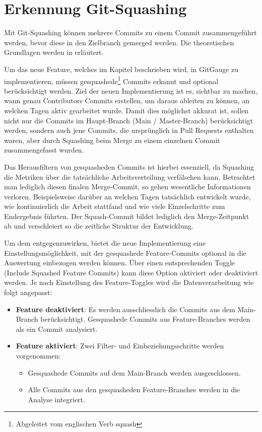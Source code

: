 \section{Erkennung Git-Squashing}
\label{sec:ErkennungSquashing}
Mit Git-Squashing können mehrere Commits zu einem Commit zusammengeführt werden, bevor diese in den Zielbranch gemerged werden. Die theoretischen Grundlagen werden in  erläutert. 


Um das neue Feature, welches im Kapitel  beschrieben wird, in GitGauge zu implementieren, müssen gesquashede\footnote{Abgeleitet vom englischen Verb squash} Commits erkannt und optional berücksichtigt werden. Ziel der neuen Implementierung ist es, sichtbar zu machen, wann genau Contributors Commits erstellen, um daraus ableiten zu können, an welchen Tagen aktiv gearbeitet wurde. Damit dies möglichst akkurat ist, sollen nicht nur die Commits im Haupt-Branch (Main / Master-Branch) berücksichtigt werden, sondern auch jene Commits, die ursprünglich in Pull Requests enthalten waren, aber durch Squashing beim Merge zu einem einzelnen Commit zusammengefasst wurden.

Das Herausfiltern von gesquasheden Commits ist hierbei essenziell, da Squashing die Metriken über die tatsächliche Arbeitsverteilung verfälschen kann. Betrachtet man lediglich diesen finalen Merge-Commit, so gehen wesentliche Informationen verloren. Beispielsweise darüber an welchen Tagen tatsächlich entwickelt wurde, wie kontinuierlich die Arbeit stattfand und wie viele Einzelschritte zum Endergebnis führten. Der Squash-Commit bildet lediglich den Merge-Zeitpunkt ab und verschleiert so die zeitliche Struktur der Entwicklung. 

Um dem entgegenzuwirken, bietet die neue Implementierung eine Einstellungsmöglichkeit, mit der gesquashede Feature-Commits optional in die Auswertung einbezogen werden können. Über einen entsprechenden Toggle (Include Squashed Feature Commits) kann diese Option aktiviert oder deaktiviert werden. Je nach Einstellung des Feature-Toggles wird die Datenverarbeitung wie folgt angepasst:
\begin{itemize}
    \item \textbf{Feature deaktiviert}: Es werden ausschliesslich die Commits aus dem Main-Branch berücksichtigt. Gesquashede Commits aus Feature-Branches werden als ein Commit analysiert.
    \item \textbf{Feature aktiviert}: Zwei Filter- und Einbeziehungsschritte werden vorgenommen:
        \begin{itemize}
        \item Gesquashede Commits auf dem Main-Branch werden ausgeschlossen.
        \item Alle Commits aus den gesquasheden Feature-Branches werden in die \linebreak Analyse integriert.
    \end{itemize}
\end{itemize}

